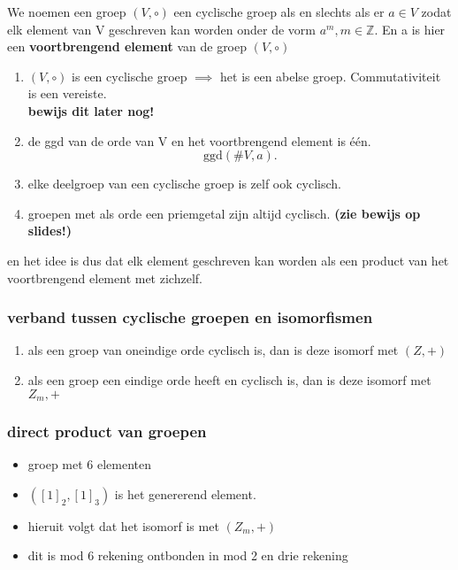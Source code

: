 \documentclass{report}
\begin{document}
We noemen een groep $(V,\circ )$ een cyclische groep als en slechts als er $a\in V$ zodat elk element van V geschreven kan worden onder de vorm $a^{m} , m \in \mathbb{Z} $. En a is hier een \textbf{voortbrengend element} van de groep $(V,\circ )$

\begin{enumerate}
	\item $(V,\circ )$ is een cyclische groep $\implies$ het is een abelse groep. Commutativiteit is een vereiste.
		\\ \textbf{bewijs dit later nog!}
	\item de ggd van de orde van V en het voortbrengend element is één.
		\[
		\text{ggd}(\#V, a) 
		.\] 
	\item  elke deelgroep van een cyclische groep is zelf ook cyclisch.
	\item groepen met als orde een priemgetal zijn altijd cyclisch. \textbf{(zie bewijs op slides!)}
\end{enumerate}

en het idee is dus dat elk element geschreven kan worden als een product van het voortbrengend element met zichzelf.

\subsubsection{verband tussen cyclische groepen en isomorfismen}
\begin{enumerate}
	\item als een groep van oneindige orde cyclisch is, dan is deze isomorf met $(Z, +)$
	\item als een groep een eindige orde heeft en cyclisch is, dan is deze isomorf met $Z_{m} , +$
\end{enumerate}

\subsubsection{direct product van groepen}

\begin{itemize}
	\item groep met 6 elementen
	\item $(\left[ 1 \right] _{2} , \left[ 1 \right] _{3} ) $ is het genererend element.
	\item hieruit volgt dat het isomorf is met $(Z_{m} ,+)$ 
	\item dit is mod 6 rekening ontbonden in mod 2 en drie rekening
\end{itemize}
\end{document}
